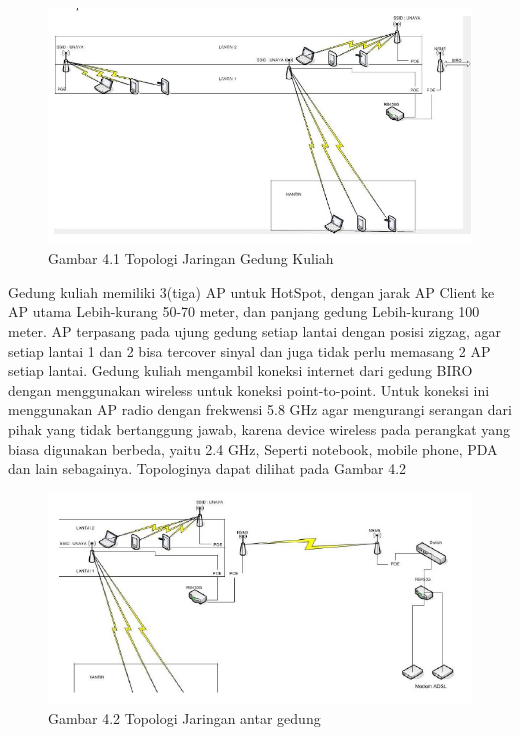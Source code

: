 \documentclass{jtetiproposalskripsi}
\begin{document}
\vspace{-0.5cm}
\begin{figure}[ht!]
  \centering
    \includegraphics[width=13cm]{gambar/topologigedung}
\caption{Gambar 4.1 Topologi Jaringan Gedung Kuliah}
\end{figure}

Gedung kuliah memiliki 3(tiga) AP untuk HotSpot, dengan jarak AP Client ke AP utama Lebih-kurang 50-70 meter, dan panjang gedung  Lebih-kurang 100 meter. AP terpasang pada ujung gedung setiap lantai dengan posisi zigzag, agar setiap lantai 1 dan 2 bisa tercover sinyal dan juga tidak perlu memasang 2 AP setiap lantai. Gedung kuliah mengambil koneksi internet dari gedung BIRO dengan menggunakan wireless untuk koneksi point-to-point. Untuk koneksi ini menggunakan AP radio dengan frekwensi 5.8 GHz agar mengurangi serangan dari pihak yang tidak bertanggung jawab, karena device wireless pada perangkat yang biasa digunakan berbeda, yaitu 2.4 GHz, Seperti notebook, mobile phone, PDA dan lain sebagainya. Topologinya dapat dilihat pada Gambar 4.2

\vspace{-0.5cm}
\begin{figure}[ht!]
  \centering
    \includegraphics[width=13cm]{gambar/topologi2gedung}
\caption{Gambar 4.2 Topologi Jaringan antar gedung}
\end{figure}
\end{document}
